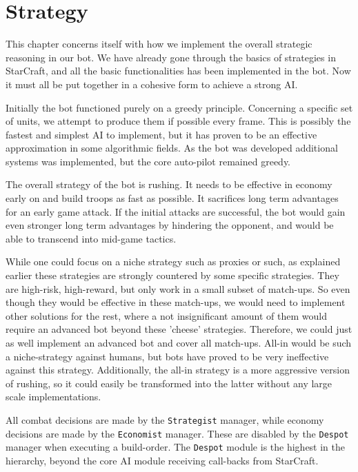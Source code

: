 \chapter{Strategy}
This chapter concerns itself with how we implement the overall strategic reasoning in our bot. We have already gone through the basics of strategies in StarCraft, and all the basic functionalities has been implemented in the bot. Now it must all be put together in a cohesive form to achieve a strong AI.

Initially the bot functioned purely on a greedy principle. Concerning a specific set of units, we attempt to produce them if possible every frame. This is possibly the fastest and simplest AI to implement, but it has proven to be an effective approximation in some algorithmic fields. As the bot was developed additional systems was implemented, but the core auto-pilot remained greedy.

The overall strategy of the bot is rushing. It needs to be effective in economy early on and build troops as fast as possible. It sacrifices long term advantages for an early game attack. If the initial attacks are successful, the bot would gain even stronger long term advantages by hindering the opponent, and would be able to transcend into mid-game tactics.

While one could focus on a niche strategy such as proxies or such, as explained earlier these strategies are strongly countered by some specific strategies. They are high-risk, high-reward, but only work in  a small subset of match-ups. So even though they would be effective in these match-ups, we would need to implement other solutions for the rest, where a not insignificant amount of them would require an advanced bot beyond these 'cheese' strategies. Therefore, we could just as well implement an advanced bot and cover all match-ups. All-in would be such a niche-strategy against humans, but bots have proved to be very ineffective against this strategy. Additionally, the all-in strategy is a more aggressive version of rushing, so it could easily be transformed into the latter without any large scale implementations.

All combat decisions are made by the \texttt{Strategist} manager, while economy decisions are made by the \texttt{Economist} manager. These are disabled by the \texttt{Despot} manager when executing a build-order. The \texttt{Despot} module is the highest in the hierarchy, beyond the core AI module receiving call-backs from StarCraft.

